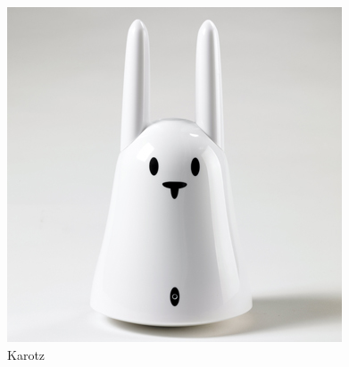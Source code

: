 

\begin{figure}
	\begin{minipage}[b]{0.4\linewidth}
		\centering
			\includegraphics[width=0.20\paperwidth]{Pictures/karotz.jpg}
		\caption{Karotz}
		\label{fig:karotz}
	\end{minipage}
	\hspace{3cm}
	\begin{minipage}[b]{0.4\linewidth}
	\centering

\end{minipage}
\end{figure}
